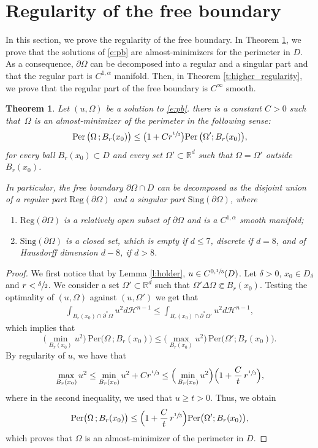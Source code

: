 \documentclass[JEP,XML,SOM,Unicode]{cedram}
\newenvironment{enumeratei}
{\bgroup\def\theenumi{\roman{enumi}}\def\theenumii{\arabic{enumii}}\begin{enumerate}}
{\end{enumerate}\egroup}
\newcommand{\Per}{\mathrm{Per}}
\newcommand{\Reg}{\mathrm{Reg}}
\newcommand{\Sing}{\mathrm{Sing}}
\theoremstyle{plain}
\newtheorem{teo}{Theorem}[section]
\theoremstyle{definition}
\def\R{\mathbb{R}}
\def\HH{\mathcal{H}}
\begin{document}
\section{Regularity of the free boundary}\label{s:regularity}
In this section, we prove the regularity of the free boundary. In Theorem \ref{t:regularity}, we prove that the solutions of \eqref{e:pb} are almost-minimizers for the perimeter in $D$. As a consequence, $\partial\Omega$ can be decomposed into a regular and a singular part and that the regular part is $C^{1,\alpha}$ manifold. Then, in Theorem \ref{t:higher_regularity}, we prove that the regular part of the free boundary is $C^\infty$ smooth.
\begin{teo}\label{t:regularity}
Let $(u,\Omega)$ be a solution to \eqref{e:pb}.
there is a constant $C>0$ such that~$\Omega$ is an almost-minimizer of the perimeter in the following sense:
\[\Per\,\big(\Omega\,; B_r(x_0)\big) \leq \big(1 + Cr^{\sfrac13} \big) \Per\,\big(\Omega'; B_r(x_0)\big),\]
for every ball $B_r(x_0)\subset D$ and every set $\Omega'\subset \R^d$ such that $\Omega=\Omega'$ outside $B_r(x_0)$.

In particular, the free boundary $\partial\Omega\cap D$ can be decomposed as the disjoint union of a regular part $\Reg(\partial\Omega)$ and a singular part $\Sing(\partial\Omega)$, where
\begin{enumeratei}
\item $\Reg(\partial\Omega)$ is a relatively open subset of $\partial\Omega$ and is a $C^{1,\alpha}$ smooth manifold;
\item $\Sing(\partial\Omega)$ is a closed set, which is empty if $d\le 7$, discrete if $d=8$, and of Hausdorff dimension $d-8$, if $d>8$.
\end{enumeratei}
\end{teo}
\begin{proof}
We first notice that by Lemma \ref{l:holder}, $u \in C^{0,\sfrac13}(D)$. Let $\delta>0$, $x_0\in D_\delta$ and $r<\sfrac{\delta}2$. We consider a set $\Omega'\subset \R^d$ such that $\Omega'\Delta \Omega \Subset B_r(x_0)$. Testing the optimality of $(u,\Omega)$ against $(u,\Omega')$ we get that
\begin{align*}
\int_{B_r(x_0)\cap \partial^\ast \Omega}u^2d\HH^{n-1} \leq \int_{B_r(x_0)\cap \partial^\ast \Omega'}u^2d\HH^{n-1},
\end{align*}
which implies that
\[\Big(\min_{B_r(x_0)} u^2\Big)\, \Per\big(\Omega\,; B_r(x_0)\big) \leq \Big(\max_{B_r(x_0)} u^2\Big)\, \Per\big(\Omega'; B_r(x_0)\big).\]
By regularity of $u$, we have that
\[\max_{B_r(x_0)} u^2 \leq \min_{B_r(x_0)} u^2 + Cr^{\sfrac13}\le \Big(\min_{B_r(x_0)} u^2\Big)\Bigl(1+\frac{C}{t}\,r^{\sfrac13}\Bigr),\]
where in the second inequality, we used that $u\ge t>0$. Thus, we obtain
\[\Per\big(\Omega\,; B_r(x_0)\big) \leq \Bigl(1 + \frac{C}{t}\,r^{\sfrac13} \Bigr) \Per\big(\Omega'; B_r(x_0)\big),\]
which proves that $\Omega$ is an almost-minimizer of the perimeter in $D$.
\end{proof}
\end{document}
